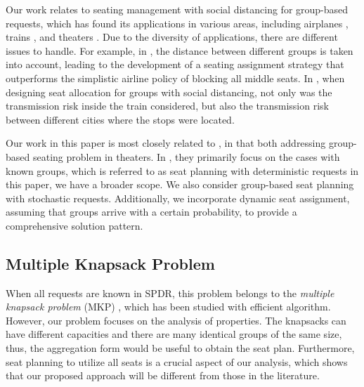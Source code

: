 Our work relates to seating management with social distancing for group-based requests, which has found its applications in various areas, including airplanes \parencite{salari2022social}, trains \parencite{haque2023social}, and theaters \parencite{blom2022filling}. Due to the diversity of applications, there are different issues to handle. For example, in \textcite{salari2022social}, the distance between different groups is taken into account, leading to the development of a seating assignment strategy that outperforms the simplistic airline policy of blocking all middle seats. In \textcite{haque2023social}, when designing seat allocation for groups with social distancing, not only was the transmission risk inside the train considered, but also the transmission risk between different cities where the stops were located.


Our work in this paper is most closely related to \textcite{blom2022filling}, in that both addressing group-based seating problem in theaters. In \textcite{blom2022filling}, they primarily focus on the cases with known groups, which is referred to as seat planning with deterministic requests in this paper, we have a broader scope. We also consider group-based seat planning with stochastic requests. Additionally, we incorporate dynamic seat assignment, assuming that groups arrive with a certain probability, to provide a comprehensive solution pattern.


\subsection{Multiple Knapsack Problem}
When all requests are known in SPDR, this problem belongs to the \textit{multiple knapsack problem} (MKP) \parencite{ferreira1996solving, pisinger1999exact}, which has been studied with efficient algorithm. However, our problem focuses on the analysis of properties. The knapsacks can have different capacities and there are many identical groups of the same size, thus, the aggregation form would be useful to obtain the seat plan. Furthermore, seat planning to utilize all seats is a crucial aspect of our analysis, which shows that our proposed approach will be different from those in the literature.



